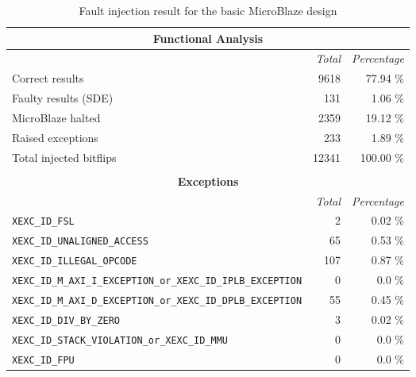 \begin{table}[H]
\small
\centering
\begin{tabular}{ l|rr }
    \hline
    \multicolumn{3}{|c|}{\textbf{Functional Analysis}} \\
    \hline
    &\textit{Total}&\textit{Percentage} \\
    \cline{2-3}
    Correct results & 9618 & 77.94 \%\\
    Faulty results (SDE) & 131 & 1.06 \%\\
    MicroBlaze halted & 2359 & 19.12 \%\\
    Raised exceptions & 233 & 1.89 \%\\
    \hline
    Total injected bitflips & 12341 & 100.00 \%\\
    \\
    \hline
    \multicolumn{3}{|c|}{\textbf{Exceptions}}\\
    \hline
    &\textit{Total}&\textit{Percentage} \\
    \cline{2-3}
    \small
    \texttt{XEXC\_ID\_FSL} & 2 & 0.02 \%\\
    \texttt{XEXC\_ID\_UNALIGNED\_ACCESS} & 65 & 0.53 \%\\
    \texttt{XEXC\_ID\_ILLEGAL\_OPCODE}& 107 & 0.87 \%\\
    \texttt{XEXC\_ID\_M\_AXI\_I\_EXCEPTION\_or\_XEXC\_ID\_IPLB\_EXCEPTION} & 0 & 0.0 \%\\
    \texttt{XEXC\_ID\_M\_AXI\_D\_EXCEPTION\_or\_XEXC\_ID\_DPLB\_EXCEPTION} & 55 & 0.45 \%\\
    \texttt{XEXC\_ID\_DIV\_BY\_ZERO} & 3 & 0.02 \%\\
    \texttt{XEXC\_ID\_STACK\_VIOLATION\_or\_XEXC\_ID\_MMU} & 0 & 0.0 \%\\
    \texttt{XEXC\_ID\_FPU} & 0 & 0.0 \%\\
    \hline
\end{tabular}
\caption{Fault injection result for the basic MicroBlaze design}
\label{tab:fi_base}
\end{table}






